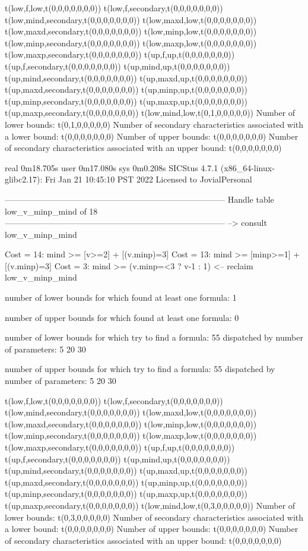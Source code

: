 t(low,f,low,t(0,0,0,0,0,0,0))
t(low,f,secondary,t(0,0,0,0,0,0,0))
t(low,mind,secondary,t(0,0,0,0,0,0,0))
t(low,maxd,low,t(0,0,0,0,0,0,0))
t(low,maxd,secondary,t(0,0,0,0,0,0,0))
t(low,minp,low,t(0,0,0,0,0,0,0))
t(low,minp,secondary,t(0,0,0,0,0,0,0))
t(low,maxp,low,t(0,0,0,0,0,0,0))
t(low,maxp,secondary,t(0,0,0,0,0,0,0))
t(up,f,up,t(0,0,0,0,0,0,0))
t(up,f,secondary,t(0,0,0,0,0,0,0))
t(up,mind,up,t(0,0,0,0,0,0,0))
t(up,mind,secondary,t(0,0,0,0,0,0,0))
t(up,maxd,up,t(0,0,0,0,0,0,0))
t(up,maxd,secondary,t(0,0,0,0,0,0,0))
t(up,minp,up,t(0,0,0,0,0,0,0))
t(up,minp,secondary,t(0,0,0,0,0,0,0))
t(up,maxp,up,t(0,0,0,0,0,0,0))
t(up,maxp,secondary,t(0,0,0,0,0,0,0))
t(low,mind,low,t(0,1,0,0,0,0,0))
Number of lower bounds:                                             t(0,1,0,0,0,0,0)
Number of secondary characteristics associated with a lower bound:  t(0,0,0,0,0,0,0)
Number of upper bounds:                                             t(0,0,0,0,0,0,0)
Number of secondary characteristics associated with an upper bound: t(0,0,0,0,0,0,0)

real	0m18.705s
user	0m17.080s
sys	0m0.208s
SICStus 4.7.1 (x86_64-linux-glibc2.17): Fri Jan 21 10:45:10 PST 2022
Licensed to JovialPersonal


--------------------------------------------------------------------------------
Handle table low_v_minp_mind of 18
--------------------------------------------------------------------------------
--> consult low_v_minp_mind

Cost = 14:  mind >= [v>=2] + [(v.minp)=3]
Cost = 13:  mind >= [minp>=1] + [(v.minp)=3]
Cost =  3:  mind >= (v.minp=<3 ? v-1 : 1)
<-- reclaim low_v_minp_mind

number of lower bounds for which found at least one formula: 1

number of upper bounds for which found at least one formula: 0

number of lower bounds for which try to find a formula: 55
dispatched by number of parameters: 5  20  30

number of upper bounds for which try to find a formula: 55
dispatched by number of parameters: 5  20  30

t(low,f,low,t(0,0,0,0,0,0,0))
t(low,f,secondary,t(0,0,0,0,0,0,0))
t(low,mind,secondary,t(0,0,0,0,0,0,0))
t(low,maxd,low,t(0,0,0,0,0,0,0))
t(low,maxd,secondary,t(0,0,0,0,0,0,0))
t(low,minp,low,t(0,0,0,0,0,0,0))
t(low,minp,secondary,t(0,0,0,0,0,0,0))
t(low,maxp,low,t(0,0,0,0,0,0,0))
t(low,maxp,secondary,t(0,0,0,0,0,0,0))
t(up,f,up,t(0,0,0,0,0,0,0))
t(up,f,secondary,t(0,0,0,0,0,0,0))
t(up,mind,up,t(0,0,0,0,0,0,0))
t(up,mind,secondary,t(0,0,0,0,0,0,0))
t(up,maxd,up,t(0,0,0,0,0,0,0))
t(up,maxd,secondary,t(0,0,0,0,0,0,0))
t(up,minp,up,t(0,0,0,0,0,0,0))
t(up,minp,secondary,t(0,0,0,0,0,0,0))
t(up,maxp,up,t(0,0,0,0,0,0,0))
t(up,maxp,secondary,t(0,0,0,0,0,0,0))
t(low,mind,low,t(0,3,0,0,0,0,0))
Number of lower bounds:                                             t(0,3,0,0,0,0,0)
Number of secondary characteristics associated with a lower bound:  t(0,0,0,0,0,0,0)
Number of upper bounds:                                             t(0,0,0,0,0,0,0)
Number of secondary characteristics associated with an upper bound: t(0,0,0,0,0,0,0)


